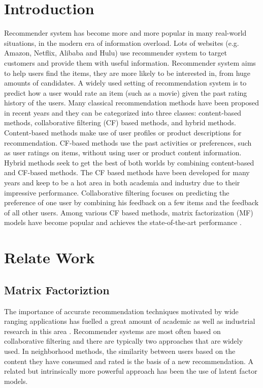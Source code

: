 \documentclass{sig-alternate-05-2015}
\begin{document}
\section{Introduction}
Recommender system has become more and more popular in many real-world situations, in the modern era of information overload.
Lots of websites (e.g. Amazon, Netflix, Alibaba and Hulu) use recommender system to target customers and provide them with useful information.
Recommender system aims to help users find the items, they are more likely to be interested in, from huge amounts of candidates.
A widely used setting of recommendation system is to predict how a user would rate an item (such as a movie) given the past rating history of the users.
Many classical recommendation methods have been proposed in recent years and they can be categorized into three classes:
content-based methods, collaborative filtering (CF) based methods, and hybrid methods.
Content-based methods \cite{pazzani2007content} make use of user profiles or product descriptions for recommendation.
CF-based methods \cite{su2009survey} use the past activities or preferences, such as user ratings on items, without using user or product content information.
Hybrid methods \cite{wang2011collaborative} seek to get the best of both worlds by combining content-based and CF-based methods.
The CF based methods have been developed for many years and keep to be a hot area in both academia and industry due to their impressive performance.
Collaborative filtering focuses on predicting the preference of one user by combining his feedback on a few items and the feedback of all other users.
Among various CF based methods, matrix factorization (MF) models have become popular and achieves the state-of-the-art performance \cite{koren2009matrix}.

\section{Relate Work}
\subsection{Matrix Factoriztion}
The importance of accurate recommendation techniques motivated by wide ranging applications
has fuelled a great amount of academic as well as industrial research in this area \cite{ricci2011introduction}.
Recommender systems are most often based on collaborative filtering and
there are typically two approaches that are widely used.
In neighborhood methods, the similarity between users based on the content
they have consumed and rated is the basis of a new recommendation.
A related but intrinsically more powerful approach has been the use of latent factor models.
\end{document}
